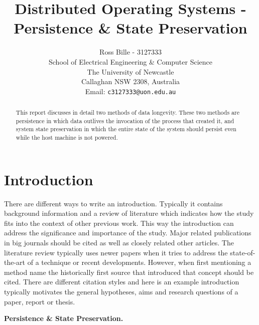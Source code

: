\documentclass[a4paper,12pt]{article}
\newenvironment{boxit}{\begin{lrbox}{\savepar}
        \begin{minipage}[b]{4.6in}}
        {\end{minipage}\end{lrbox}\fbox{\usebox{\savepar}}}
\begin{document}
%
\title{\bf Distributed Operating Systems - Persistence \& State Preservation}
%
\author{Ross Bille - 3127333\\
School of Electrical Engineering \& Computer Science\\
The University of Newcastle\\ Callaghan NSW 2308, Australia\\
Email: \texttt{c3127333@uon.edu.au} } 

\maketitle


\newpage
\begin{abstract}%
\noindent This report discusses in detail two methods of data longevity. These two methods are persistence in which data outlives the invocation of the process that created it, and system state preservation in which the entire state of the system should persist even while the host machine is not powered.
\end{abstract}

\pagebreak

\tableofcontents

\pagebreak

\section{Introduction}

There are different ways to write an introduction. Typically it
contains background information and a review of literature which
indicates how the study fits into the context of other previous
work. This way the introduction can  address the significance and importance of the study. Major related publications in big journals should be cited
as well as closely related other articles. The literature review typically uses newer papers when it tries to address the state-of-the-art of a technique or recent developments. However, when first mentioning a method name the historically first source that introduced that concept should be cited. There are different citation styles and here is an example introduction
typically motivates the general hypotheses, aims and research questions
of a paper, report or thesis.  

\begin{center}
\begin{boxit}
\textbf{Persistence \& State Preservation.}
\end{boxit}
\end{center}
\end{document}
